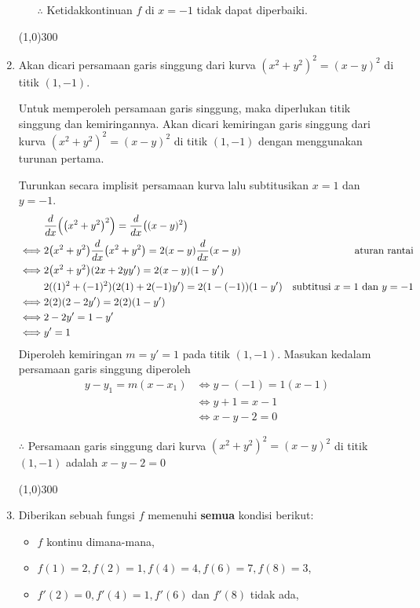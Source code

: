 \begin{enumerate}[leftmargin=*, label={\arabic*}.]
\begin{enumerate}[label={\alph*}.]
    $\therefore$ Ketidakkontinuan $f$ di $x=-1$ tidak dapat diperbaiki.

    \end{enumerate}

\begin{center}\line(1,0){300}\end{center}


\item Akan dicari persamaan garis singgung dari kurva $(x^2+y^2)^2=(x-y)^2$ di titik $(1,-1)$.

Untuk memperoleh persamaan garis singgung, maka diperlukan titik singgung dan kemiringannya.
Akan dicari kemiringan garis singgung dari kurva $(x^2+y^2)^2=(x-y)^2$ di titik $(1,-1)$ dengan 
menggunakan turunan pertama.

Turunkan secara implisit persamaan kurva lalu subtitusikan $x=1$ dan $y=-1$.
\begin{align*}
    &\drv{x}{\brk*{x^{2}+y^{2}}^{2}} = \drv{x}{(x-y)^{2}}\\
    \iff &2\brk*{x^{2}+y^{2}}\drv{x}{x^{2}+y^{2}} = 2(x-y)\drv{x}{x-y}
    &\text{aturan rantai}\\
    \iff &2\brk*{x^{2}+y^{2}}(2x+2yy') = 2(x-y)(1-y')\\
    &2((1)^{2}+(-1)^{2})(2(1)+2(-1)y') = 2(1-(-1))(1-y')
    &\text{subtitusi $x=1$ dan $y=-1$}\\
    \iff &2(2)(2-2y')=2(2)(1-y')\\
    \iff & 2-2y'=1-y'\\
    \iff & y'=1
\end{align*}
Diperoleh kemiringan $m=y'=1$ pada titik $(1,-1)$.
Masukan kedalam persamaan garis singgung diperoleh
\begin{align*}
    y-y_{1} = m(x-x_{1}) &\iff y-(-1)=1(x-1)\\
    &\iff y+1 = x-1\\
    &\iff x-y-2=0 
\end{align*}

$\therefore$ Persamaan garis singgung dari kurva $(x^2+y^2)^2=(x-y)^2$ di titik $(1,-1)$ adalah 
$x-y-2=0$


\begin{center}\line(1,0){300}\end{center}


\item Diberikan sebuah fungsi $f$ memenuhi \textbf{semua} kondisi berikut:
    \begin{itemize}
    \item $f$ kontinu dimana-mana,
    \item $f(1)=2,f(2)=1,f(4)=4,f(6)=7,f(8)=3$,
    \item $f'(2)=0,f'(4)=1,f'(6)$ dan $f'(8)$ tidak ada,
    

\end{itemize}
\end{enumerate}
